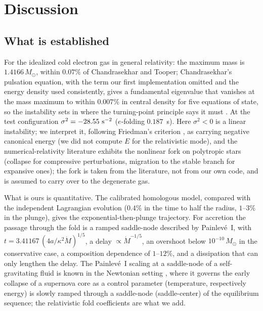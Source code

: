\documentclass[11pt]{article}
\begin{document}
\section{Discussion}
\label{sec:discussion}

\subsection{What is established}

For the idealized cold electron gas in general relativity: the maximum mass is $1.4166\,M_\odot$, within $0.07\%$ of Chandrasekhar and Tooper; Chandrasekhar's pulsation equation, with the term our first implementation omitted and the energy density used consistently, gives a fundamental eigenvalue that vanishes at the mass maximum to within $0.007\%$ in central density for five equations of state, so the instability sets in where the turning-point principle says it must \citep{HTWW1965,HadzicLin2021}. At the test configuration $\sigma^2=-28.55\ {\rm s}^{-2}$ ($e$-folding $0.187$~s). Here $\sigma^2<0$ is a linear instability; we interpret it, following Friedman's criterion \citep{FriedmanLectures}, as carrying negative canonical energy (we did not compute $E$ for the relativistic mode), and the numerical-relativity literature \citep{FontEtAl2002,RadiceRezzollaKellermann2010} exhibits the nonlinear fork on polytropic stars (collapse for compressive perturbations, migration to the stable branch for expansive ones); the fork is taken from the literature, not from our own code, and is assumed to carry over to the degenerate gas.

What is ours is quantitative. The calibrated homologous model, compared with the independent Lagrangian evolution ($0.4\%$ in the time to half the radius, $1$--$3\%$ in the plunge), gives the exponential-then-plunge trajectory. For accretion the passage through the fold is a ramped saddle-node described by Painlev\'e~I, with $t=3.41167\,(4a/\kappa^2\dot M)^{1/5}$, a delay $\propto\dot M^{-1/5}$, an overshoot below $10^{-10}\,M_\odot$ in the conservative case, a composition dependence of $1$--$12\%$, and a dissipation that can only lengthen the delay. The Painlev\'e~I scaling at a saddle-node of a self-gravitating fluid is known in the Newtonian setting \citep{Pomeau2014,Chavanis2020}, where it governs the early collapse of a supernova core as a control parameter (temperature, respectively energy) is slowly ramped through a saddle-node (saddle-center) of the equilibrium sequence; the relativistic fold coefficients are what we add.
\end{document}
